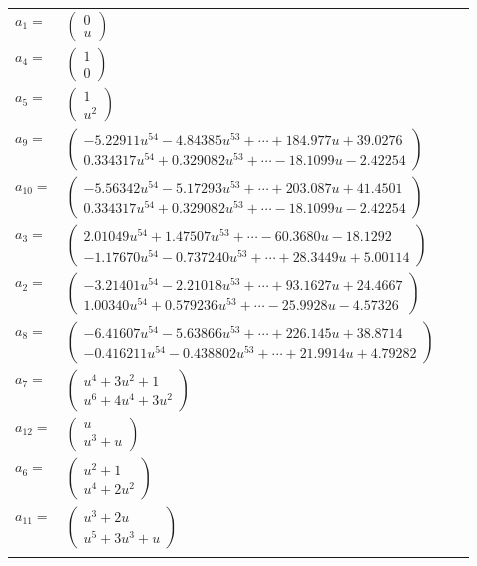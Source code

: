 \documentclass[1p]{elsarticle_modified}
\theoremstyle{definition}
\begin{document}
\begin{tabular}{m{7pt} m{180pt} m{7pt} m{180pt} }
\flushright $a_{1}=$&$\begin{pmatrix}0\\u\end{pmatrix}$ \\
\flushright $a_{4}=$&$\begin{pmatrix}1\\0\end{pmatrix}$ \\
\flushright $a_{5}=$&$\begin{pmatrix}1\\u^2\end{pmatrix}$ \\
\flushright $a_{9}=$&$\begin{pmatrix}-5.22911 u^{54}-4.84385 u^{53}+\cdots+184.977 u+39.0276\\0.334317 u^{54}+0.329082 u^{53}+\cdots-18.1099 u-2.42254\end{pmatrix}$ \\
\flushright $a_{10}=$&$\begin{pmatrix}-5.56342 u^{54}-5.17293 u^{53}+\cdots+203.087 u+41.4501\\0.334317 u^{54}+0.329082 u^{53}+\cdots-18.1099 u-2.42254\end{pmatrix}$ \\
\flushright $a_{3}=$&$\begin{pmatrix}2.01049 u^{54}+1.47507 u^{53}+\cdots-60.3680 u-18.1292\\-1.17670 u^{54}-0.737240 u^{53}+\cdots+28.3449 u+5.00114\end{pmatrix}$ \\
\flushright $a_{2}=$&$\begin{pmatrix}-3.21401 u^{54}-2.21018 u^{53}+\cdots+93.1627 u+24.4667\\1.00340 u^{54}+0.579236 u^{53}+\cdots-25.9928 u-4.57326\end{pmatrix}$ \\
\flushright $a_{8}=$&$\begin{pmatrix}-6.41607 u^{54}-5.63866 u^{53}+\cdots+226.145 u+38.8714\\-0.416211 u^{54}-0.438802 u^{53}+\cdots+21.9914 u+4.79282\end{pmatrix}$ \\
\flushright $a_{7}=$&$\begin{pmatrix}u^4+3 u^2+1\\u^6+4 u^4+3 u^2\end{pmatrix}$ \\
\flushright $a_{12}=$&$\begin{pmatrix}u\\u^3+u\end{pmatrix}$ \\
\flushright $a_{6}=$&$\begin{pmatrix}u^2+1\\u^4+2 u^2\end{pmatrix}$ \\
\flushright $a_{11}=$&$\begin{pmatrix}u^3+2 u\\u^5+3 u^3+u\end{pmatrix}$\\&\end{tabular}
\end{document}
